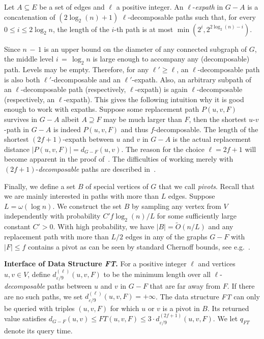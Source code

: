 \documentclass{theoretics}
\newcommand*{\Otilde}{\widetilde{O}}
\renewcommand{\le}{\leqslant}
\renewcommand{\ge}{\geqslant}
\newcommand{\eps}{\varepsilon}
\begin{document}
\begin{definition}
\label{def:l-expath}
  Let $A \subseteq E$ be a set of edges and $\ell$ a positive integer.
  An $\ell$-\emph{expath} in $G-A$ is a concatenation of $(2\log_2(n)+1)$
  $\ell$-decomposable paths
  such that, for every $0 \le i \le 2\log_2 n$,
  the length of the $i$-th path is at most $\min(2^i, 2^{2\log_2(n) - i})$.
\end{definition}

Since $n\,{-}\,1$ is an upper bound on the diameter of any connected subgraph of $G$,
the middle level $i \,{=}\, \log_2 n$ is large enough to accompany any (decomposable) path.
Levels may be empty.
Therefore, for any $\ell' \ge \ell$, an $\ell$-decomposable path is also both $\ell'$-decomposable
and an $\ell'$-expath.
Also, an arbitrary subpath of an $\ell$-decomposable path 
(respectively, \mbox{$\ell$-expath}) is again $\ell$-decomposable (respectively, an \mbox{$\ell$-expath}).
This gives the following intuition why it is good enough to work with expaths.
Suppose some replacement path $P(u,v,F)$ survives in $G{-}A$
albeit $A \supseteq F$ may be much larger than $F$, 
then the shortest $u$-$v$-path in $G-A$ is indeed $P(u,v,F)$ and thus $f$-decomposable.
The length of the shortest $(2f{+}1)$-expath
between $u$ and $v$ in $G{-}A$ is the actual replacement distance $|P(u,v,F)| = d_{G-F}(u,v)$.
The reason for the choice $\ell = 2f+1$ will become apparent in the proof of~.
The difficulties of working merely with $(2f{+}1)$-\emph{decomposable} paths are described in~.

Finally, we define a set $B$ of special vertices of $G$ that we call \emph{pivots}.
Recall that we are mainly interested in paths with more than $L$ edges.
Suppose $L = \omega(\log n)$.
We construct the set $B$ by sampling any vertex from $V$ independently with probability
$C' f \log_2(n)/L$ for some sufficiently large constant $C' > 0$.
With high probability, we have $|B| = \Otilde(n/L)$
and any replacement path with more than $L/2$ edges
in any of the graphs $G-F$ with $|F| \le f$
contains a pivot as can be seen by standard Chernoff bounds,
see e.g.~\cite{GrandoniVWilliamsFasterRPandDSO_journal,RodittyZwick12kSimpleShortestPaths,WY13}.
\vspace*{.5em}

\noindent
\textbf{Interface of Data Structure \emph{FT}.}
For a positive integer $\ell$ and vertices $u,v \in V$,
define $d^{(\ell)}_{\eps/9}(u,v,F)$
to be the minimum length over all $\ell$-\emph{decomposable} paths
between $u$ and $v$ in $G-F$ that are far away from $F$.
If there are no such paths, we set $d^{(\ell)}_{\eps/9}(u,v,F) = +\infty$.
The data structure \emph{FT} can only be queried with triples $(u,v,F)$
for which $u$ or $v$ is a pivot in $B$.
Its returned value satisfies
$d_{G-F}(u,v) \le FT(u,v,F) \le 3 \cdot d^{(2f+1)}_{\eps/9}(u,v,F)$.
We let $q_{FT}$ denote its query time.
\end{document}
